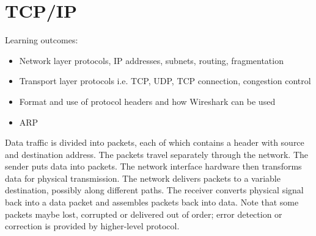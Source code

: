 \documentclass[twoside]{article}
\begin{document}
\section{TCP/IP}
Learning outcomes:
\begin{itemize}
    \item Network layer protocols, IP addresses, subnets, routing,
    fragmentation
    \item Transport layer protocols i.e. TCP, UDP, TCP connection, congestion
    control
    \item Format and use of protocol headers and how Wireshark can be used
    \item ARP
\end{itemize}
Data traffic is divided into packets, each of which contains a header with 
source and destination address. The packets travel separately through the 
network. The sender puts data into packets. The network interface hardware
then transforms data for physical transmission. The network delivers packets
to a variable destination, possibly along different paths. The receiver 
converts physical signal back into a data packet and assembles packets back
into data. Note that some packets maybe lost, corrupted or delivered out of 
order; error detection or correction is provided by higher-level protocol. \\
\end{document}
